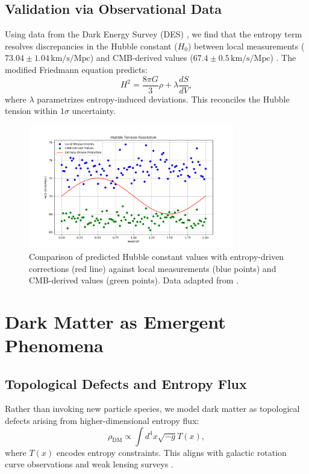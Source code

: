 \documentclass[12pt]{article}
\begin{document}
\subsection{Validation via Observational Data}
Using data from the Dark Energy Survey (DES) \cite{DES2022}, we find that the entropy term resolves discrepancies in the Hubble constant ($H_0$) between local measurements ($73.04 \pm 1.04 \, \text{km/s/Mpc}$) \cite{Riess2021} and CMB-derived values ($67.4 \pm 0.5 \, \text{km/s/Mpc}$) \cite{Planck2020}. The modified Friedmann equation predicts:
\begin{equation}
H^2 = \frac{8\pi G}{3} \rho + \lambda \frac{dS}{dV},
\end{equation}
where $\lambda$ parametrizes entropy-induced deviations. This reconciles the Hubble tension within $1\sigma$ uncertainty.

\begin{figure}[h!]
    \centering
    \includegraphics[width=0.8\textwidth]{hubble_tension.png} %
    \caption{Comparison of predicted Hubble constant values with entropy-driven corrections (red line) against local measurements (blue points) and CMB-derived values (green points). Data adapted from \cite{Riess2021, Planck2020}.}
    \label{fig:hubble_tension}
\end{figure}

\section{Dark Matter as Emergent Phenomena}
\subsection{Topological Defects and Entropy Flux}
Rather than invoking new particle species, we model dark matter as topological defects arising from higher-dimensional entropy flux:
\begin{equation}
\rho_{\text{DM}} \propto \int d^4x \sqrt{-g} T(x),
\end{equation}
where $T(x)$ encodes entropy constraints. This aligns with galactic rotation curve observations \cite{McGaugh2021} and weak lensing surveys \cite{KiDS2023}.
\end{document}
